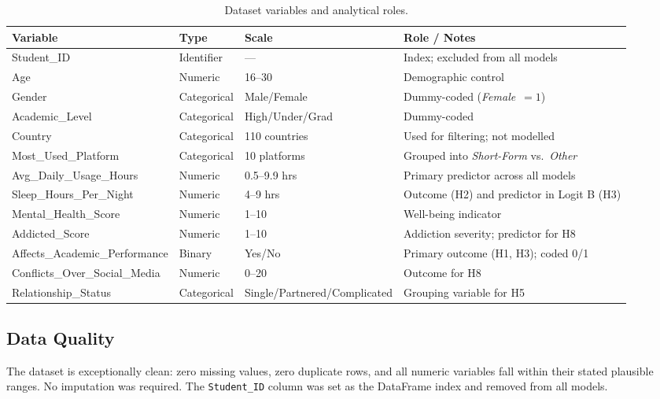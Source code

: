 \documentclass[10pt]{article}
\begin{document}
\begin{table}[H]
\centering
\caption{Dataset variables and analytical roles.}
\label{tab:variables}
\small
\begin{tabularx}{\linewidth}{@{} l l l X @{}}
\toprule
\textbf{Variable} & \textbf{Type} & \textbf{Scale} & \textbf{Role / Notes} \\
\midrule
Student\_ID & Identifier & --- & Index; excluded from all models \\
Age & Numeric & 16--30 & Demographic control \\
Gender & Categorical & Male/Female & Dummy-coded (\textit{Female}~$= 1$) \\
Academic\_Level & Categorical & High/Under/Grad & Dummy-coded \\
Country & Categorical & 110 countries & Used for filtering; not modelled \\
Most\_Used\_Platform & Categorical & 10 platforms & Grouped into \textit{Short-Form} vs.\ \textit{Other} \\
Avg\_Daily\_Usage\_Hours & Numeric & 0.5--9.9 hrs & Primary predictor across all models \\
Sleep\_Hours\_Per\_Night & Numeric & 4--9 hrs & Outcome (H2) and predictor in Logit B (H3) \\
Mental\_Health\_Score & Numeric & 1--10 & Well-being indicator \\
Addicted\_Score & Numeric & 1--10 & Addiction severity; predictor for H8 \\
Affects\_Academic\_Performance & Binary & Yes/No & Primary outcome (H1, H3); coded 0/1 \\
Conflicts\_Over\_Social\_Media & Numeric & 0--20 & Outcome for H8 \\
Relationship\_Status & Categorical & Single/Partnered/Complicated & Grouping variable for H5 \\
\bottomrule
\end{tabularx}
\end{table}

\subsection{Data Quality}

The dataset is exceptionally clean: zero missing values, zero duplicate rows,
and all numeric variables fall within their stated plausible ranges. No
imputation was required. The \texttt{Student\_ID} column was set as the
DataFrame index and removed from all models.
\end{document}
